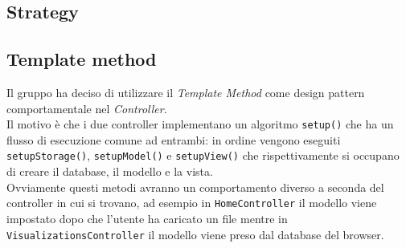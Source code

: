 \subsection{Strategy}
\subsection{Template method}
Il gruppo ha deciso di utilizzare il \textit{Template Method} come design pattern comportamentale nel \textit{Controller}. \\Il motivo è che i due controller implementano un algoritmo \texttt{setup()} che ha un flusso di esecuzione comune ad entrambi: in ordine vengono eseguiti \texttt{setupStorage()}, \texttt{setupModel()} e \texttt{setupView()} che rispettivamente si occupano di creare il database, il modello e la vista. \\Ovviamente questi metodi avranno un comportamento diverso a seconda del controller in cui si trovano, ad esempio in \texttt{HomeController} il modello viene impostato dopo che l'utente ha caricato un file mentre in \texttt{VisualizationsController} il modello viene preso dal database del browser.
